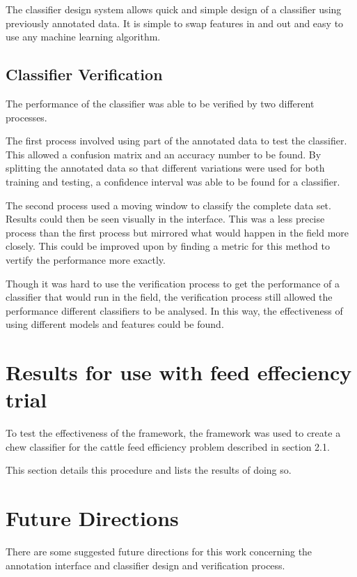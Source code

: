 The classifier design system allows quick and simple design of a classifier using previously annotated data. It is simple to swap features in and out and easy to use any machine learning algorithm. 

\subsection{Classifier Verification}

The performance of the classifier was able to be verified by two different processes. 

The first process involved using part of the annotated data to test the classifier. This allowed a confusion matrix and an accuracy number to be found. By splitting the annotated data so that different variations were used for both training and testing, a confidence interval was able to be found for a classifier. 

The second process used a moving window to classify the complete data set. Results could then be seen visually in the interface. This was a less precise process than the first process but mirrored what would happen in the field more closely. This could be improved upon by finding a metric for this method to vertify the performance more exactly. 

Though it was hard to use the verification process to get the performance of a classifier that would run in the field, the verification process still allowed the performance different classifiers to be analysed. In this way, the effectiveness of using different models and features could be found. 

\section{Results for use with feed effeciency trial}

To test the effectiveness of the framework, the framework was used to create a chew classifier for the cattle feed efficiency problem described in section 2.1. 

This section details this procedure and lists the results of doing so. 


\section{Future Directions}

There are some suggested future directions for this work concerning the annotation interface and classifier design and verification process. 



